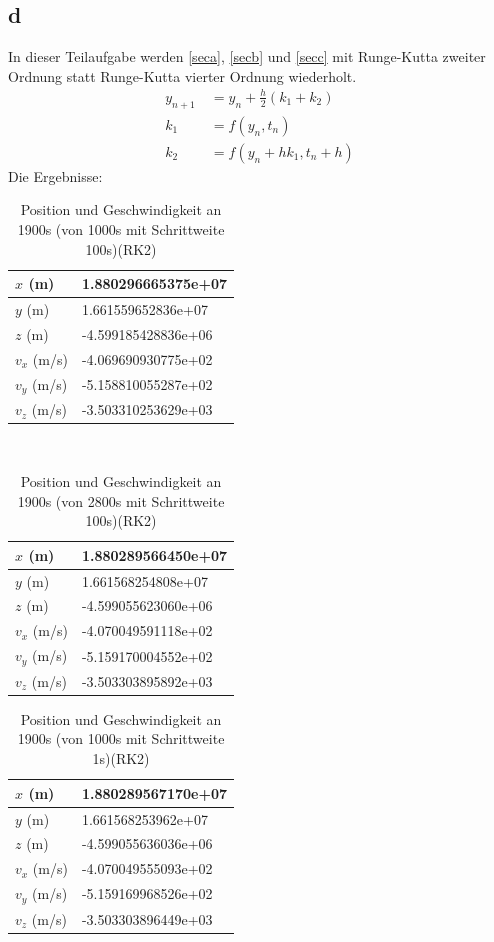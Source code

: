 \subsection{d}
In dieser Teilaufgabe werden \ref{seca}, \ref{secb} und \ref{secc} mit Runge-Kutta zweiter Ordnung statt Runge-Kutta vierter Ordnung wiederholt. 
\begin{align}
	y_{n+1} & \ = y_n + \frac{h}{2}(k_1 + k_2) \\
	k_1 & \ = f(y_n,t_n) \\
	k_2 & \ = f(y_n + hk_1, t_n + h)
\end{align}
Die Ergebnisse:
\begin{table}[htbp]\centering
	\begin{tabular}{|l|l|}
		\hline
		$x$ (m)     & 1.880296665375e+07  \\ \hline
		$y$ (m)     & 1.661559652836e+07  \\ \hline
		$z$ (m)     & -4.599185428836e+06 \\ \hline
		$v_x$ (m/s) & -4.069690930775e+02 \\ \hline
		$v_y$ (m/s) & -5.158810055287e+02 \\ \hline
		$v_z$ (m/s) & -3.503310253629e+03 \\ \hline
	\end{tabular}
	\caption{Position und Geschwindigkeit an 1900s (von 1000s mit Schrittweite 100s)(RK2)}
\end{table}\\
\begin{table}[htbp]\centering
	\begin{tabular}{|l|l|}
		\hline
		$x$ (m)     & 1.880289566450e+07  \\ \hline
		$y$ (m)     & 1.661568254808e+07  \\ \hline
		$z$ (m)     & -4.599055623060e+06 \\ \hline
		$v_x$ (m/s) & -4.070049591118e+02 \\ \hline
		$v_y$ (m/s) & -5.159170004552e+02 \\ \hline
		$v_z$ (m/s) & -3.503303895892e+03 \\ \hline
	\end{tabular}
	\caption{Position und Geschwindigkeit an 1900s (von 2800s mit Schrittweite 100s)(RK2)}
\end{table}
\clearpage
\begin{table}[htbp]\centering
	\begin{tabular}{|l|l|}
		\hline
		$x$ (m)     & 1.880289567170e+07  \\ \hline
		$y$ (m)     & 1.661568253962e+07  \\ \hline
		$z$ (m)     & -4.599055636036e+06 \\ \hline
		$v_x$ (m/s) & -4.070049555093e+02 \\ \hline
		$v_y$ (m/s) & -5.159169968526e+02 \\ \hline
		$v_z$ (m/s) & -3.503303896449e+03 \\ \hline
	\end{tabular}
	\caption{Position und Geschwindigkeit an 1900s (von 1000s mit Schrittweite 1s)(RK2)}
\end{table}
